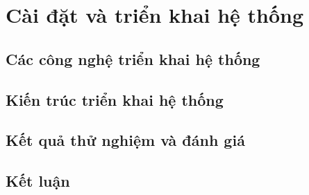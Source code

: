 \chapter[\MakeUppercase{Cài đặt và triển khai hệ thống}]{Cài đặt và triển khai hệ thống}
\label{ch:chuong6}

\section{Các công nghệ triển khai hệ thống}

\section{Kiến trúc triển khai hệ thống}

\section{Kết quả thử nghiệm và đánh giá}

\section{Kết luận}
